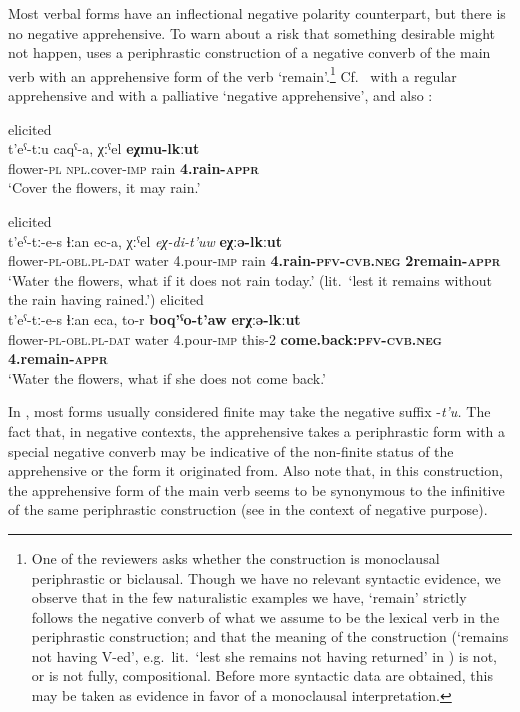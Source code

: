 \documentclass[output=paper,colorlinks,citecolor=brown]{langscibook}
\begin{document}
 Most verbal forms have an inflectional negative polarity counterpart, but there is no negative apprehensive. To warn about a risk that something desirable might not happen,  uses a periphrastic construction of a negative converb of the main verb with an apprehensive form of the verb `remain'.\footnote{One of the reviewers asks whether the construction is monoclausal periphrastic or biclausal. Though we have no relevant syntactic evidence, we observe that in the few naturalistic examples we have, `remain' strictly follows the negative converb of what we assume to be the lexical verb in the periphrastic construction; and that the meaning of the construction (`remains not having V-ed', e.g.\  lit.\ `lest she remains not having returned' in ) is not, or is not fully, compositional. Before more syntactic data are obtained, this may be taken as evidence in favor of a monoclausal interpretation.} Cf.\  with a regular apprehensive and  with a palliative `negative apprehensive', and also :

\ea \label{ex:DD9} \textnormal{elicited} \\
\gll t'eˁ-tːu caqˁ-a, χːˁel \textbf{eχmu-lkːut} \\
flower-\textsc{pl} \textsc{npl}.cover-\textsc{imp} rain \textbf{4.rain-\textsc{appr}} \\
\glt `Cover the flowers, it may rain.'
\z


\ea \label{ex:DD10} \textnormal{elicited} \\
\gll t'eˁ-tː-e-s ɬːan ec-a, χːˁel \textit{eχ-di-t'uw} \textbf{eχːə-lkːut} \\
flower-\textsc{pl-obl.pl-dat} water 4.pour-\textsc{imp} rain \textbf{4.rain-\textsc{pfv-cvb.neg}} \textbf{{\textlangle}2{\textrangle}remain-\textsc{appr}} \\
\glt `Water the flowers, what if it does not rain today.' (lit.\ `lest it remains without the rain having rained.')
\z
\ea \label{ex:DD11} \textnormal{elicited} \\
\gll t'eˁ-tː-e-s ɬːan eca, to-r \textbf{boq'ˁo-t'aw} \textbf{e{\textlangle}r{\textrangle}χːə-lkːut}\\
flower-\textsc{pl-obl.pl-dat} water 4.pour-\textsc{imp} this-2 \textbf{come.back:\textsc{pfv-cvb.neg}} \textbf{4.remain-\textsc{appr}}\\
\glt `Water the flowers, what if she does not come back.'
\z 



In , most forms usually considered finite may take the negative suffix \nobreakdash-\textit{t'u.} The fact that, in negative contexts, the apprehensive takes a periphrastic form with a special negative converb may be indicative of the non-finite status of the apprehensive or the form it originated from. Also note that, in this construction, the apprehensive form of the main verb seems to be synonymous to the infinitive of the same periphrastic construction (see  in the context of negative purpose).
\end{document}
